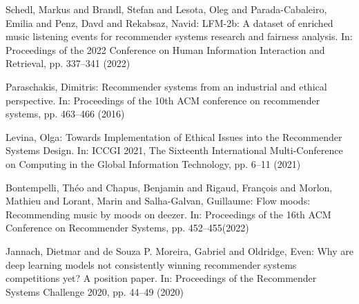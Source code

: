 \documentclass[runningheads,a4paper]{llncs}
\begin{document}
\begin{thebibliography}{4}
 Schedl, Markus and Brandl, Stefan and Lesota, Oleg and Parada-Cabaleiro, Emilia and Penz, Davd and Rekabsaz, Navid:
LFM-2b: A dataset of enriched music listening events for recommender systems research and fairness analysis. In:
Proceedings of the 2022 Conference on Human Information Interaction and Retrieval, pp. 337--341 (2022)


 Paraschakis, Dimitris:
Recommender systems from an industrial and ethical perspective. In:
Proceedings of the 10th ACM conference on recommender systems, pp.
463--466 (2016)

Levina, Olga:
Towards Implementation of Ethical Issues into the Recommender Systems Design. In:
ICCGI 2021, The Sixteenth International Multi-Conference on Computing in the Global Information Technology, 
pp. 6--11 (2021)

 Bontempelli, Th{\'e}o and Chapus, Benjamin and Rigaud, Fran{\c{c}}ois and Morlon, Mathieu and Lorant, Marin and Salha-Galvan, Guillaume:
Flow moods: Recommending music by moods on deezer. In: 
Proceedings of the 16th ACM Conference on Recommender Systems, pp. 
452--455(2022)

 Jannach, Dietmar and de Souza P. Moreira, Gabriel and Oldridge, Even:
Why are deep learning models not consistently winning recommender systems competitions yet? A position paper. In:
Proceedings of the Recommender Systems Challenge 2020, pp. 44--49 (2020)





\end{thebibliography}
\end{document}
